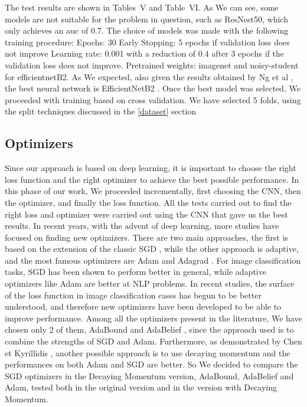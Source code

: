 \documentclass[journal, a4paper]{IEEEtran}
\begin{document}
The test results are shown in Tables~V and Table~VI. As We can see, some models are not suitable for the problem in question, such as ResNest50, which only achieves an auc of 0.7. The choice of models was made with the following training procedure:
Epochs: 30
Early Stopping: 5 epochs if validation loss does not improve
Learning rate: 0.001 with a reduction of 0.4 after 3 epochs if the validation loss does not improve.
Pretrained weights: imagenet and noisy-student for efficientnetB2.
As We expected, also given the results obtained by Ng et al \cite{CHEXRAY}, the best neural network is EfficientNetB2 \cite{EFFNET}.
Once the best model was selected, We proceeded with training based on cross validation. We have selected 5 folds, using the split techniques discussed in the \ref{dataset} section

\subsection{Optimizers}
Since our approach is based on deep learning, it is important to choose the right loss function and the right optimizer to achieve the best possible performance. In this phase of our work, We proceeded incrementally, first choosing the CNN, then the optimizer, and finally the loss function. All the tests carried out to find the right loss and optimizer were carried out using the CNN that gave us the best results.
In recent years, with the advent of deep learning, more studies have focused on finding new optimizers. There are two main approaches, the first is based on the extension of the classic SGD \cite{SGD}, while the other approach is adaptive, and the most famous optimizers are Adam \cite{ADAM} and Adagrad \cite{ADAGRAD}. For image classification tasks, SGD has been shown to perform better in general, while adaptive optimizers like Adam are better at NLP problems. In recent studies, the surface of the loss function in image classification cases has begun to be better understood, and therefore new optimizers have been developed to be able to improve performance. Among all the optimizers present in the literature, We have chosen only 2 of them, AdaBound \cite{ADABOUND} and AdaBelief \cite{ADABELIEF}, since the approach used is to combine the strengths of SGD and Adam. 
Furthermore, as demonstrated by Chen et Kyrillidis \cite{DEMON}, another possible approach is to use decaying momentum and the performances on both Adam and SGD are better. 
So We decided to compare the SGD optimizers in the Decaying Momentum version, AdaBound, AdaBelief and Adam, tested both in the original version and in the version with Decaying Momentum. 
\end{document}
